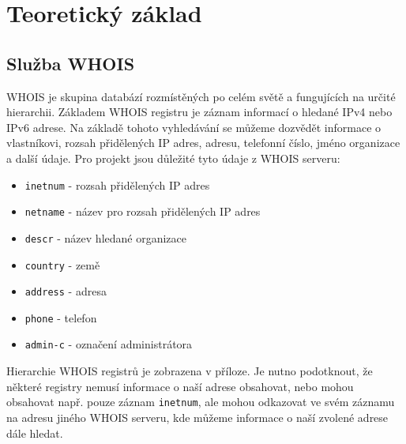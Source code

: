 \documentclass[a4paper, 11pt]{article}
\begin{document}
 
 \section{Teoretický základ}
 \subsection{Služba WHOIS}
 WHOIS je skupina databází rozmístěných po celém světě a fungujících na určité hierarchii. Základem WHOIS registru je záznam informací o hledané IPv4 nebo IPv6 adrese. Na základě tohoto vyhledávání se můžeme dozvědět informace o vlastníkovi, rozsah přidělených IP adres, adresu, telefonní číslo, jméno organizace a další údaje.
 Pro projekt jsou důležité tyto údaje z WHOIS serveru:
 \begin{itemize}
 \item \verb|inetnum| - rozsah přidělených IP adres
 \item \verb|netname| - název pro rozsah přidělených IP adres
 \item \verb|descr| - název hledané organizace
 \item \verb|country| - země
 \item \verb|address| - adresa 
 \item \verb|phone| - telefon 
 \item \verb|admin-c| - označení administrátora
 \end{itemize}
Hierarchie WHOIS registrů je zobrazena v příloze. Je nutno podotknout, že některé registry nemusí informace o naší adrese obsahovat, nebo mohou obsahovat např. pouze záznam \verb|inetnum|, ale mohou odkazovat ve svém záznamu na adresu jiného WHOIS serveru, kde můžeme informace o naší zvolené adrese dále hledat. 
 
\end{document}
